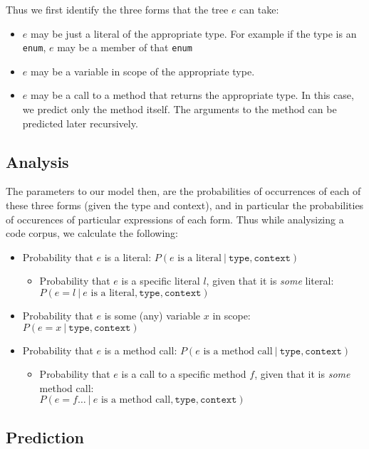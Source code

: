 \documentclass{article} %
\begin{document}
Thus we first identify the three forms that the tree $e$ can take:
\begin{itemize}
  \item $e$ may be just a literal of the appropriate type. For example if the type is an \texttt{enum}, $e$ may be a member of that \texttt{enum}
  \item $e$ may be a variable in scope of the appropriate type.
  \item $e$ may be a call to a method that returns the appropriate type. In this case, we predict only the method itself. The arguments to the method can be predicted later recursively.
\end{itemize}

\subsection*{Analysis}
The parameters to our model then, are the probabilities of occurrences of each of these three forms (given the type and context), and in particular the probabilities of occurences of particular expressions of each form. Thus while analysizing a code corpus, we calculate the following:
\begin{itemize}
  \item Probability that $e$ is a literal: $P(e \text{ is a literal} ~|~  \texttt{type} , \texttt{context} ) $
    \begin{itemize}
      \item Probability that $e$ is a specific literal $l$, given that it is \emph{some} literal: \\$P(e = l ~|~ e \text{ is a literal},  \texttt{type} , \texttt{context} )$
    \end{itemize}
  \item Probability that $e$ is some (any) variable $x$ in scope: $P(e = x ~|~ \texttt{type} , \texttt{context})$
  \item Probability that $e$ is a method call: $P(e \text{ is a method call} ~|~  \texttt{type} , \texttt{context} ) $
    \begin{itemize}
      \item Probability that $e$ is a call to a specific method $f$, given that it is \emph{some} method call: \\$P(e = f \ldots ~|~ e \text{ is a method call},  \texttt{type} , \texttt{context} )$
    \end{itemize}
\end{itemize}

\subsection*{Prediction}
\end{document}
